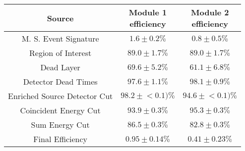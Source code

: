 \begin{tabular}{|c|c|c|}
\hline
  Source & \makecell{Module 1\\efficiency} & \makecell{Module 2\\efficiency} \\
\hline
  M. S. Event Signature & $1.6 \pm 0.2\%$ & $0.8 \pm 0.5\%$ \\
  Region of Interest & $89.0 \pm 1.7\%$ & $89.0 \pm 1.7\%$ \\
  Dead Layer & $69.6 \pm 5.2\%$ & $61.1 \pm 6.8\%$ \\
  Detector Dead Times & $97.6 \pm 1.1\%$ & $98.1 \pm 0.9\%$ \\
  Enriched Source Detector Cut & $98.2 \pm{}<\!0.1)\%$ & $94.6 \pm{}<\!0.1)\%$ \\
  Coincident Energy Cut & $93.9 \pm 0.3\%$ & $95.3 \pm 0.3\%$ \\
  Sum Energy Cut & $86.5 \pm 0.3\%$ & $82.8 \pm 0.3\%$ \\
  \hline Final Efficiency & $0.95 \pm 0.14\%$ & $0.41 \pm 0.23\%$ \\
\hline
\end{tabular}
